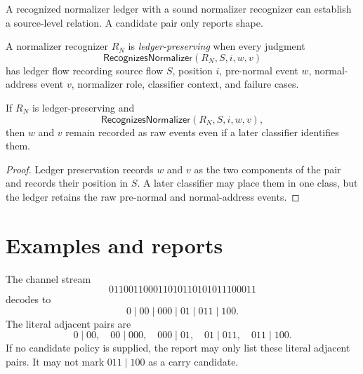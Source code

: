 \begin{corollary}
\label{cor:source-normalizer-recognized-stronger-than-candidate}
A recognized normalizer ledger with a sound normalizer recognizer can establish a source-level relation. A candidate pair only reports shape.
\end{corollary}

\begin{definition}
\label{def:source-normalizer-ledger-preserving}
A normalizer recognizer $R_N$ is \emph{ledger-preserving} when every judgment
$$
  \mathsf{RecognizesNormalizer}(R_N,S,i,w,v)
$$
has ledger flow recording source flow $S$, position $i$, pre-normal event $w$, normal-address event $v$, normalizer role, classifier context, and failure cases.
\end{definition}

\begin{theorem}
\label{thm:source-normalizer-ledger-preserving-no-collapse}
If $R_N$ is ledger-preserving and
$$
  \mathsf{RecognizesNormalizer}(R_N,S,i,w,v),
$$
then $w$ and $v$ remain recorded as raw events even if a later classifier identifies them.
\end{theorem}

\begin{proof}
Ledger preservation records $w$ and $v$ as the two components of the pair and records their position in $S$. A later classifier may place them in one class, but the ledger retains the raw pre-normal and normal-address events.
\end{proof}

\section{Examples and reports}
\label{sec:source-normalizer-examples-reports}

\begin{example}
\label{ex:source-normalizer-completion-literal-listing}
The channel stream
$$
  011001100011010110101011100011
$$
decodes to
$$
  0\mid 00\mid 000\mid 01\mid 011\mid 100.
$$
The literal adjacent pairs are
$$
  0\mid 00,\quad
  00\mid 000,\quad
  000\mid 01,\quad
  01\mid 011,\quad
  011\mid 100.
$$
If no candidate policy is supplied, the report may only list these literal adjacent pairs. It may not mark $011\mid 100$ as a carry candidate.
\end{example}

